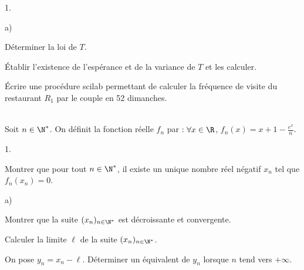 \documentclass[11pt]{article}%
\begin{document}
\begin{exerciceAP}
\begin{noliste}{1.}
    \begin{noliste}{a)}
    \setlength{\itemsep}{2mm}
    \item Déterminer la loi de $T$.
    \item Établir l'existence de l'espérance et de la variance de $T$
      et les calculer.
    \end{noliste}

  \item Écrire une procédure scilab permettant de calculer la
    fréquence de visite du restaurant $R_1$ par le couple en 52
    dimanches.
  \end{noliste}
\end{exerciceAP}


\begin{exerciceSP}~\\
  Soit $n \in \N^*$. On définit la fonction réelle $f_n$ par :
  $\forall x \in \R$, $f_n (x) = x + 1 - \frac{ e^x }{ n }$.
  \begin{noliste}{1.}
    \setlength{\itemsep}{2mm}
  \item Montrer que pour tout $n \in \N^*$, il existe un unique nombre
    réel négatif $x_n$ tel que $f_n ( x_n ) = 0$.
  \item 
    \begin{noliste}{a)}
    \setlength{\itemsep}{2mm}
    \item Montrer que la suite $(x_n)_{ n \in \N^* }$ est décroissante
      et convergente.
    \item Calculer la limite $\ell$ de la suite $(x_n)_{ n \in \N^* }$.
    \end{noliste}
  \item On pose $y_n = x_n - \ell$. Déterminer un équivalent de $y_n$
    lorsque $n$ tend vers $+\infty$.
  \end{noliste}
\end{exerciceSP}


\newpage


\end{document}
